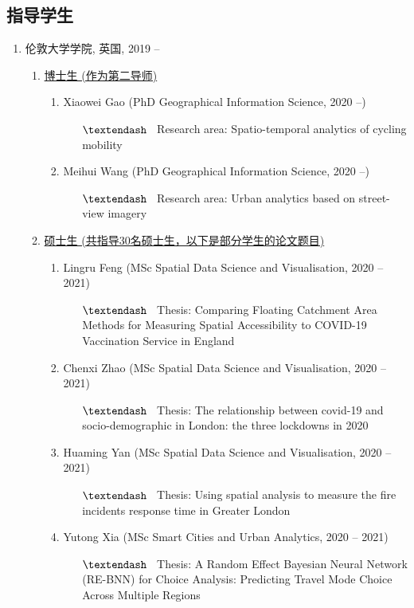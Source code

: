\documentclass[A4,11pt]{article}
\newcommand{\MScStduentItem}[4]{
  \item #1 (#2, #3)
   \begin{itemize}
    \item[$\textendash$] \ #4
   \end{itemize}
}
\begin{document}
\begin{CJK*}{UTF8}{gbsn}

\section{指导学生}
\vspace{2mm}
\begin{enumerate}
   \item 伦敦大学学院, 英国, 2019 --
     \begin{enumerate}
       \item \underline{博士生 (作为第二导师)}
       \begin{enumerate}
           \item Xiaowei Gao (PhD Geographical Information Science, 2020 --)
           \begin{itemize}
            \item[$\textendash$] \ Research area: Spatio-temporal analytics of cycling mobility
           \end{itemize}
           \item Meihui Wang (PhD Geographical Information Science, 2020 --)
           \begin{itemize}
            \item[$\textendash$] \ Research area: Urban analytics based on street-view imagery
           \end{itemize}
       \end{enumerate}
       \item \underline{硕士生 (共指导30名硕士生，以下是部分学生的论文题目)}
       \begin{enumerate}
           \MScStduentItem{Lingru Feng}{MSc Spatial Data Science and Visualisation}{2020 -- 2021}
           {Thesis: Comparing Floating Catchment Area Methods for Measuring Spatial Accessibility to COVID-19 Vaccination Service in England}
           \MScStduentItem{Chenxi Zhao}{MSc Spatial Data Science and Visualisation}{2020 -- 2021}
           {Thesis: The relationship between covid-19 and socio-demographic in London: the three lockdowns in 2020}
           \MScStduentItem{Huaming Yan}{MSc Spatial Data Science and Visualisation}{2020 -- 2021}
           {Thesis: Using spatial analysis to measure the fire incidents response time in Greater London}
           \MScStduentItem{Yutong Xia}{MSc Smart Cities and Urban Analytics}{2020 -- 2021}
           {Thesis: A Random Effect Bayesian Neural Network (RE-BNN) for Choice Analysis: Predicting Travel Mode Choice Across Multiple Regions}

\end{enumerate}
\end{enumerate}
\end{enumerate}
\end{CJK*}
\end{document}
